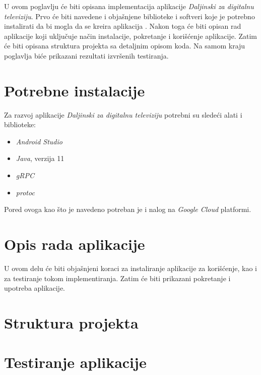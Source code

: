 \documentclass[../TamaraIvanovicMasterRad.tex]{subfiles}
\begin{document}
U ovom poglavlju će biti opisana implementacija aplikacije \textit{Daljinski za digitalnu televiziju}. Prvo će biti navedene i objašnjene biblioteke i softveri koje je potrebno instalirati da bi mogla da se kreira aplikacija . Nakon toga će biti opisan rad aplikacije koji uključuje način instalacije, pokretanje i korišćenje aplikacije. Zatim će biti opisana struktura projekta sa detaljnim opisom koda. Na samom kraju poglavlja biće prikazani rezultati izvršenih testiranja.

\section{Potrebne instalacije} 
Za razvoj aplikacije \textit{Daljinski za digitalnu televiziju} potrebni su sledeći alati i biblioteke:
\begin{itemize}
    \item \textit{Android Studio}
    \item \textit{Java}, verzija 11
    \item \textit{gRPC}
    \item \textit{protoc}
\end{itemize}
Pored ovoga kao što je navedeno potreban je i nalog na \textit{Google Cloud} platformi.
\section{Opis rada aplikacije} \label{opis_rada}
U ovom delu će biti objašnjeni koraci za instaliranje aplikacije za korišćenje, kao i za testiranje tokom implementiranja. Zatim će biti prikazani pokretanje i upotreba aplikacije. 





\section{Struktura projekta}



\section{Testiranje aplikacije}

\end{document}
